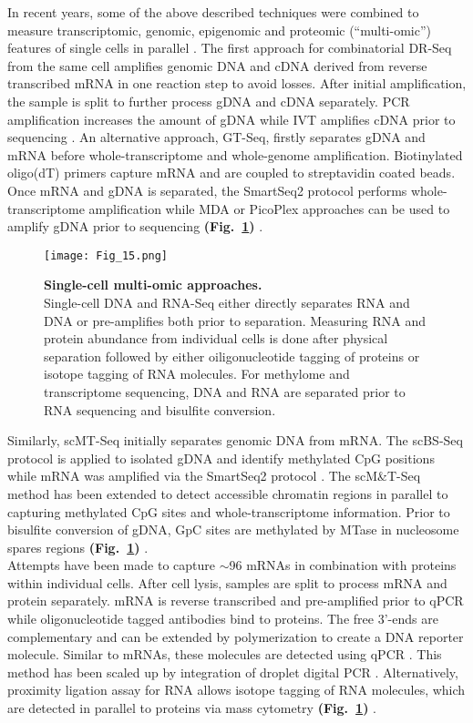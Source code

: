 In recent years, some of the above described techniques were combined to measure transcriptomic, genomic, epigenomic and proteomic (“multi-omic”) features of single cells in parallel \citep{Macaulay2017}. The first approach for combinatorial \gls{DR-Seq} from the same cell amplifies genomic DNA and cDNA derived from reverse transcribed mRNA in one reaction step to avoid losses. After initial amplification, the sample is split to further process gDNA and cDNA separately. PCR amplification increases the amount of gDNA while IVT amplifies cDNA prior to sequencing \citep{Dey2015}. An alternative approach, \gls{GT-Seq}, firstly separates gDNA and mRNA before whole-transcriptome and whole-genome amplification. Biotinylated oligo(dT) primers capture mRNA and are coupled to streptavidin coated beads. Once mRNA and gDNA is separated, the SmartSeq2 protocol performs whole-transcriptome amplification while MDA or PicoPlex approaches can be used to amplify gDNA prior to sequencing \textbf{(Fig.~\ref{fig0:multiomics})} \citep{Macaulay2015}.\\

\begin{figure}[!h]
\centering
\texttt{[image: Fig\_15.png]}
\caption[Single-cell multi-omic approaches]{\textbf{Single-cell multi-omic approaches.}\\
Single-cell DNA and RNA-Seq either directly separates RNA and DNA or pre-amplifies both prior to separation. Measuring RNA and protein abundance from individual cells is done after physical separation followed by either oiligonucleotide tagging of proteins or isotope tagging of RNA molecules. For methylome and transcriptome sequencing, DNA and RNA are separated prior to RNA sequencing and bisulfite conversion.}
\label{fig0:multiomics}
\end{figure}

Similarly, \gls{scMT-Seq} initially separates genomic DNA from mRNA. The scBS-Seq protocol is applied to isolated gDNA and identify methylated CpG positions while mRNA was amplified via the SmartSeq2 protocol \citep{Angermueller2016a}. The scM\&{}T-Seq method has been extended to detect accessible chromatin regions in parallel to capturing methylated CpG sites and whole-transcriptome information. Prior to bisulfite conversion of gDNA, GpC sites are methylated by MTase in nucleosome spares regions \textbf{(Fig.~\ref{fig0:multiomics})} \citep{Pott2017, Clark2018}.\\
 
Attempts have been made to capture $\sim$96 mRNAs in combination with proteins within individual cells. After cell lysis, samples are split to process mRNA and protein separately. mRNA is reverse transcribed and pre-amplified prior to \gls{qPCR} while oligonucleotide tagged antibodies bind to proteins. The free 3’-ends are complementary and can be extended by polymerization to create a DNA reporter molecule. Similar to mRNAs, these molecules are detected using qPCR \citep{Darmanis2016}. This method has been scaled up by integration of droplet digital PCR \citep{Albayrak2016}. Alternatively, proximity ligation assay for RNA allows isotope tagging of RNA molecules, which are detected in parallel to proteins via mass cytometry \textbf{(Fig.~\ref{fig0:multiomics})} \citep{Frei2016}.

